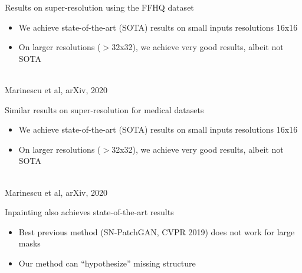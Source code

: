 \documentclass[8pt,xcolor=table,aspectratio=169]{beamer}
\begin{document}
\begin{frame}{Results on super-resolution using the FFHQ dataset}

\begin{itemize}
 \item We achieve state-of-the-art (SOTA) results on small inputs resolutions 16x16
 \item On larger resolutions ($>$32x32), we achieve very good results, albeit not SOTA
\end{itemize}

\begin{center}
\vo
{}\\
\small{Marinescu et al, arXiv, 2020}
\end{center}
 
\end{frame}

\begin{frame}{Similar results on super-resolution for medical datasets}

\begin{itemize}
 \item We achieve state-of-the-art (SOTA) results on small inputs resolutions 16x16
 \item On larger resolutions ($>$32x32), we achieve very good results, albeit not SOTA
\end{itemize}

\vspace{-1em}

\begin{center}
{}\\
\small{Marinescu et al, arXiv, 2020}
\end{center}
 
\end{frame}

\begin{frame}{Inpainting also achieves state-of-the-art results}

\begin{itemize}
 \item Best previous method (SN-PatchGAN, CVPR 2019) does not work for large masks
 \item Our method can ``hypothesize'' missing structure
\end{itemize}

\begin{center}
{}
\end{center}
 
\end{frame}
\end{document}
